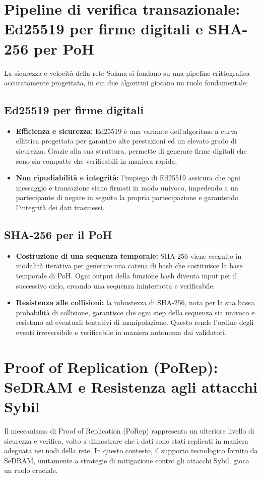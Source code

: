 \documentclass[a4paper,12pt]{report}
\begin{document}
	\section{Pipeline di verifica transazionale: Ed25519 per firme digitali e SHA-256 per PoH}
	La sicurezza e velocità della rete Solana si fondano su una pipeline crittografica accuratamente progettata, in cui due algoritmi giocano un ruolo fondamentale:
	
	\subsection{Ed25519 per firme digitali}
	\begin{itemize}
		\item \textbf{Efficienza e sicurezza:} Ed25519 è una variante dell'algoritmo a curva ellittica progettata per garantire alte prestazioni ed un elevato grado di sicurezza. Grazie alla sua struttura, permette di generare firme digitali che sono sia compatte che verificabili in maniera rapida.
		\item \textbf{Non ripudiabilità e integrità:} l'impiego di Ed25519 assicura che ogni messaggio e transazione siano firmati in modo univoco, impedendo a un partecipante di negare in seguito la propria partecipazione e garantendo l'integrità dei dati trasmessi.
	\end{itemize}
	
	\subsection{SHA-256 per il PoH}
	\begin{itemize}
		\item \textbf{Costruzione di una sequenza temporale:} SHA-256 viene eseguito in modalità iterativa per generare una catena di hash che costituisce la base temporale di PoH. Ogni output della funzione hash diventa input per il successivo ciclo, creando una sequenza ininterrotta e verificabile.
		\item \textbf{Resistenza alle collisioni:} la robustezza di SHA-256, nota per la sua bassa probabilità di collisione, garantisce che ogni step della sequenza sia univoco e resistano ad eventuali tentativi di manipolazione. Questo rende l'ordine degli eventi irreversibile e verificabile in maniera autonoma dai validatori.
	\end{itemize}
	
	\section{Proof of Replication (PoRep): SeDRAM e Resistenza agli attacchi Sybil}
	Il meccanismo di Proof of Replication (PoRep) rappresenta un ulteriore livello di sicurezza e verifica, volto a dimostrare che i dati sono stati replicati in maniera adeguata nei nodi della rete. In questo contesto, il supporto tecnologico fornito da SeDRAM, unitamente a strategie di mitigazione contro gli attacchi Sybil, gioca un ruolo cruciale.
	
\end{document}
